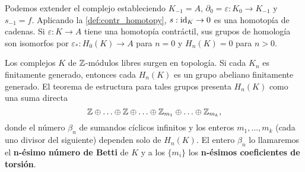Podemos extender el complejo estableciendo \( K_{-1} = A \), \( \partial_0 = \varepsilon: K_0 \to K_{-1} \) y \( s_{-1} = f \). Aplicando la \autoref{def:contr_homotopy}, \( s: \operatorname{id}_K \rightarrow 0 \) es una homotopía de cadenas. Si \( \varepsilon: K \to A \) tiene una homotopía contráctil, sus grupos de homología son isomorfos por \( \varepsilon_*: H_0(K) \rightarrow A \) para \( n = 0 \) y \( H_n(K) = 0 \) para \( n > 0 \).

Los complejos \( K \) de $\mathbb{Z}$-módulos libres surgen en topología. Si cada \( K_n \) es finitamente generado, entonces cada \( H_n(K) \) es un grupo abeliano finitamente generado. El teorema de estructura para tales grupos presenta \( H_n(K) \) como una suma directa
\[ \mathbb{Z} \oplus \ldots \oplus \mathbb{Z} \oplus \ldots \oplus \mathbb{Z}_{m_1} \oplus \ldots \oplus \mathbb{Z}_{m_k}, \]
donde el número \( \beta_n \) de sumandos cíclicos infinitos y los enteros \( m_1, \ldots, m_k \) (cada uno divisor del siguiente) dependen solo de \( H_n(K) \). El entero \( \beta_n \) lo llamaremos el \textbf{n-ésimo número de Betti} de \( K \) y a los \( \{m_i\} \) los \textbf{n-ésimos coeficientes de torsión}.


\endinput
